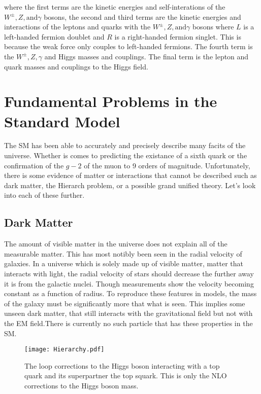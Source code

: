 where the first terms are the kinetic energies and self-interations of the $W^\pm,Z, \text{and} \gamma$ bosons, the second and third terms are the kinetic energies and interactions of the leptons and quarks with the $W^\pm,Z, \text{and} \gamma$ bosons where $L$ is a left-handed fermion doublet and $R$ is a right-handed fermion singlet. This is because the weak force only couples to left-handed fermions. The fourth term is the $W^\pm,Z,\gamma$ and Higgs masses and couplings. The final term is the lepton and quark masses and couplings to the Higgs field.  

\section{Fundamental Problems in the Standard Model}
\label{sec:SMIssues}

The SM has been able to accurately and precisely describe many facits of the universe. Whether is comes to predicting the existance of a sixth quark or the confirmation of the $g - 2$ of the muon to 9 orders of magnitude. Unfortunately, there is some evidence of matter or interactions that cannot be described such as dark matter, the Hierarch problem, or a possible grand unified theory. Let's look into each of these further.

\subsection{Dark Matter}
The amount of visible matter in the universe does not explain all of the measurable matter. This has most notibly been seen in the radial velocity of galaxies. In a universe which is solely made up of visible matter, matter that interacts with light, the radial velocity of stars should decrease the further away it is from the galactic nuclei. Though measurements show the velocity becoming constant as a function of radius. To reproduce these features in models, the mass of the galaxy must be significantly more that what is seen. This implies some unseen dark matter, that still interacts with the gravitational field but not with the EM field.There is currently no such particle that has these properties in the SM.

\begin{figure}
 	\centering
	\texttt{[image: Hierarchy.pdf]}
 	\caption{The loop corrections to the Higgs boson interacting with a top quark and its superpartner the top squark. This is only the NLO corrections to the Higgs boson mass.}
 	\label{HiggsMass} 
\end{figure}

